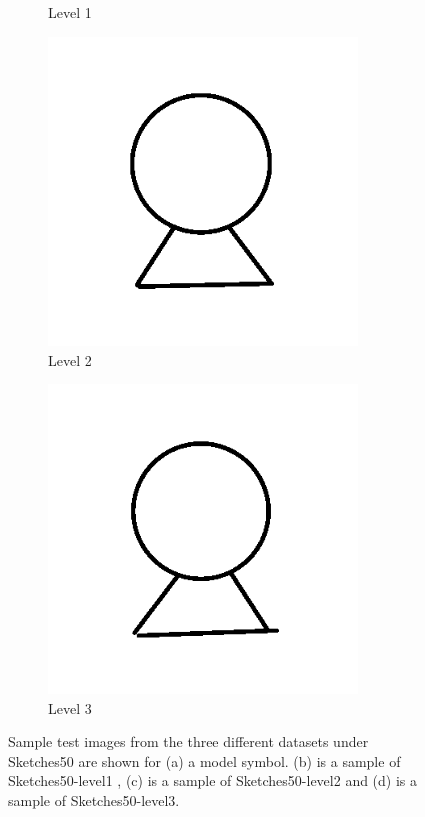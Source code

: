 \begin{figure}[h]
\begin{subfigure}[b]{0.25\textwidth}
                \caption{Level 1}
        \end{subfigure}
                \begin{subfigure}[b]{0.25\textwidth}
                \centering
                \includegraphics[width=0.9\textwidth]{figures/Results/Sketches50/level2.png}
                \caption{Level 2}
        \end{subfigure}
                \begin{subfigure}[b]{0.25\textwidth}
                \centering
                \includegraphics[width=0.9\textwidth]{figures/Results/Sketches50/level3.png}
                \caption{Level 3}
        \end{subfigure}
        \caption[Sample data from 'Sketches50' dataset]{Sample test images from the three different datasets under Sketches50 are shown for (a) a model symbol. (b) is a sample of Sketches50-level1 , (c)  is a sample of Sketches50-level2 and (d) is a sample of Sketches50-level3.}
        \label{fig:Sketches50Examples}
\end{figure}

